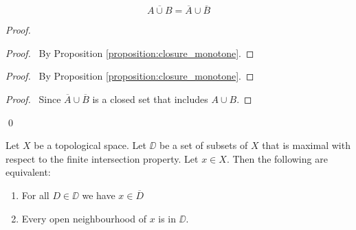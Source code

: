 \begin{proposition}
    \label{proposition:closure_union}
    \[ \overline{A \cup B} = \overline{A} \cup \overline{B} \]
\end{proposition}

\begin{proof}
    \pf
    \begin{proof}
        \pf\ By Proposition \ref{proposition:closure_monotone}.
    \end{proof}
    \begin{proof}
        \pf\ By Proposition \ref{proposition:closure_monotone}.
    \end{proof}
    \begin{proof}
        \pf\ Since $\overline{A} \cup \overline{B}$ is a closed set that includes $A \cup B$.
    \end{proof}
    \qed
\end{proof}

\begin{proposition}
    \label{proposition:every_closure_maximal_fip}
    Let $X$ be a topological space. Let $\DD$ be a set of subsets of $X$ that is maximal with respect to the finite intersection property. Let $x \in X$.
    Then the following are equivalent:
    \begin{enumerate}
        \item For all $D \in \DD$ we have $x \in \overline{D}$
        \item Every open neighbourhood of $x$ is in $\DD$.
    \end{enumerate}
\end{proposition}

